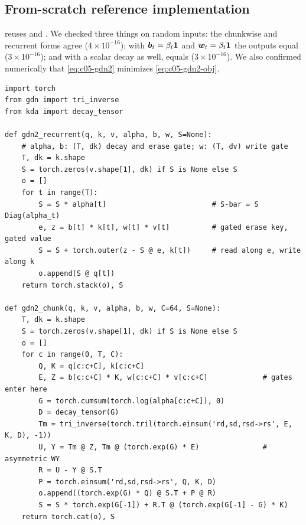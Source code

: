 \subsection{From-scratch reference implementation}

 reuses  and . We checked three
things on random inputs: the chunkwise and recurrent forms agree ($4\times10^{-16}$); with
$\bm{b}_t = \beta_t\mathbf1$ and $\bm{w}_t = \beta_t\mathbf1$ the outputs equal 
($3\times10^{-16}$); and with a scalar decay as well,  equals
 ($3\times10^{-16}$). We also confirmed numerically that
\cref{eq:c05-gdn2} minimizes \cref{eq:c05-gdn2-obj}.

\begin{lstlisting}[caption={Reference implementation (ours): Gated DeltaNet-2, recurrent and chunkwise},label={lst:c05-ours-gdn2}]
import torch
from gdn import tri_inverse
from kda import decay_tensor

def gdn2_recurrent(q, k, v, alpha, b, w, S=None):
    # alpha, b: (T, dk) decay and erase gate; w: (T, dv) write gate
    T, dk = k.shape
    S = torch.zeros(v.shape[1], dk) if S is None else S
    o = []
    for t in range(T):
        S = S * alpha[t]                         # S-bar = S Diag(alpha_t)
        e, z = b[t] * k[t], w[t] * v[t]          # gated erase key, gated value
        S = S + torch.outer(z - S @ e, k[t])     # read along e, write along k
        o.append(S @ q[t])
    return torch.stack(o), S

def gdn2_chunk(q, k, v, alpha, b, w, C=64, S=None):
    T, dk = k.shape
    S = torch.zeros(v.shape[1], dk) if S is None else S
    o = []
    for c in range(0, T, C):
        Q, K = q[c:c+C], k[c:c+C]
        E, Z = b[c:c+C] * K, w[c:c+C] * v[c:c+C]             # gates enter here
        G = torch.cumsum(torch.log(alpha[c:c+C]), 0)
        D = decay_tensor(G)
        Tm = tri_inverse(torch.tril(torch.einsum('rd,sd,rsd->rs', E, K, D), -1))
        U, Y = Tm @ Z, Tm @ (torch.exp(G) * E)               # asymmetric WY
        R = U - Y @ S.T
        P = torch.einsum('rd,sd,rsd->rs', Q, K, D)
        o.append((torch.exp(G) * Q) @ S.T + P @ R)
        S = S * torch.exp(G[-1]) + R.T @ (torch.exp(G[-1] - G) * K)
    return torch.cat(o), S
\end{lstlisting}

